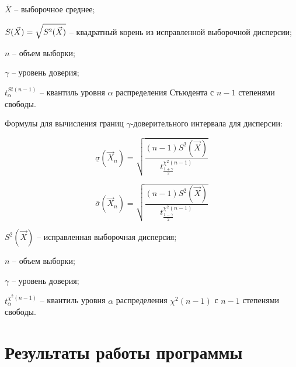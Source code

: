 \documentclass[12pt]{report}
\begin{document}
$\overline X$ -- выборочное среднее;

$S(\vec X) = \sqrtsign{S^2(\vec X)}$ -- квадратный корень из исправленной выборочной дисперсии;

$n$ -- объем выборки;

$\gamma$ -- уровень доверия;

$t^{St(n-1)}_{\alpha}$ -- квантиль уровня $\alpha$ распределения Стьюдента с $n - 1$ степенями свободы.

Формулы для вычисления границ $\gamma$-доверительного интервала для дисперсии:

\begin{equation}
	\underline\sigma(\vec X_n)= \sqrt{\frac{(n-1)S^2(\vec X)}{t^{\chi^2(n-1)}_{\frac{1+\gamma}{2}}}}
\end{equation}

\begin{equation}
	\overline\sigma(\vec X_n)= \sqrt{\frac{(n-1)S^2(\vec X)}{t^{\chi^2(n-1)}_{\frac{1-\gamma}{2}}}}
\end{equation}

$S^2(\vec X)$ -- исправленная выборочная дисперсия;

$n$ -- объем выборки;

$\gamma$ -- уровень доверия;

$t^{\chi^2(n-1)}_{\alpha}$ -- квантиль уровня $\alpha$ распределения $\chi^2(n-1)$ с $n - 1$ степенями свободы.


\chapter*{Результаты работы программы}
\end{document}
